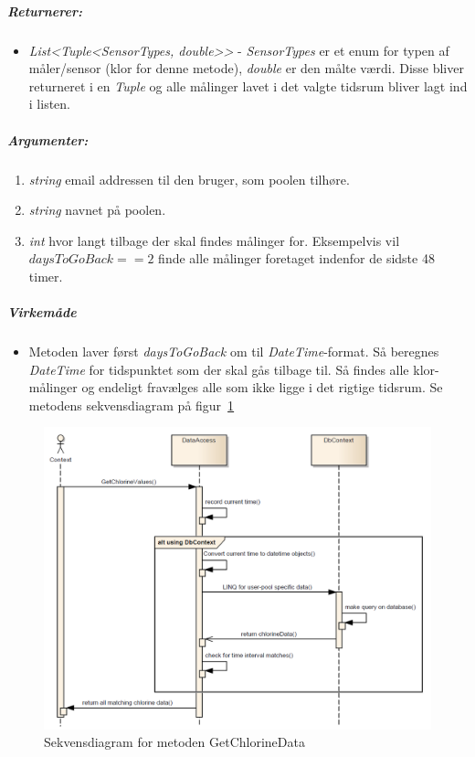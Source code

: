 \subparagraph{Returnerer:}
\begin{itemize}
	\item \textit{List<Tuple<SensorTypes, double>>} - \textit{SensorTypes} er et enum for typen af måler/sensor (klor for denne metode), \textit{double} er den målte værdi. Disse bliver returneret i en \textit{Tuple} og alle målinger lavet i det valgte tidsrum bliver lagt ind i listen.
\end{itemize}

\subparagraph{Argumenter:}
\begin{enumerate}
	\item \textit{string} email addressen til den bruger, som poolen tilhøre.
	\item \textit{string} navnet på poolen.
	\item \textit{int} hvor langt tilbage der skal findes målinger for. Eksempelvis vil $daysToGoBack == 2$ finde alle målinger foretaget indenfor de sidste 48 timer.
\end{enumerate}

\subparagraph{Virkemåde}
\begin{itemize}
	\item Metoden laver først \textit{daysToGoBack} om til \textit{DateTime}-format. Så beregnes \textit{DateTime} for tidspunktet som der skal gås tilbage til. Så findes alle klor-målinger og endeligt fravælges alle som ikke ligge i det rigtige tidsrum. Se metodens sekvensdiagram på figur~\ref{fig:getChlorineData}
\end{itemize}

\begin{figure}[h]
\centering
\includegraphics[width=0.7\linewidth]{figs/dbSeq/getChlorineData.PNG}
\caption{Sekvensdiagram for metoden GetChlorineData}
\label{fig:getChlorineData}
\end{figure}



